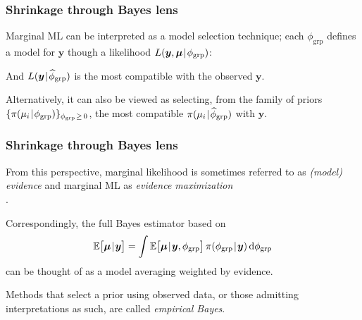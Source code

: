 \documentclass[18pt]{beamer}
\newcommand{\defineTightSpacing}{%
	\setlength{\abovedisplayskip}{.25\baselineskip}%
	\setlength{\belowdisplayskip}{.25\baselineskip}%
}
\renewcommand{\textsc}[1]{{\small \MakeUppercase{#1}}}
\newcommand{\given}{\thinnerspace | \thinnerspace}
\newcommand{\diff}{\operatorname{\mathrm{d}}\!{}}
\newcommand{\thinnerspace}{\mskip.5\thinmuskip}
\newcommand{\expectation}{\mathbb{E}}
\newcommand{\density}{\operatorname{\pi}}
\newcommand{\likelihood}{L}
\newcommand{\by}{\bm{y}}
\newcommand{\bmu}{\bm{\mu}}
\begin{document}
\begin{frame}
\frametitle{Shrinkage through Bayes lens}
Marginal {\small ML} can be interpreted as a model selection technique;
each $\phi_{\mathrm{grp}}$ defines a model for $\by$ though a likelihood $\likelihood(\by, \bmu \given \phi_{\mathrm{grp}})$:
\vspace*{-.4\baselineskip}
\begin{figure} 
\end{figure}
\vspace*{-.7\baselineskip}

\pause
And $\likelihood(\by \given \widehat{\phi}_{\mathrm{grp}})$ is the most compatible with the observed $\by$.

\pause
\smallskip
Alternatively, it can also be viewed as selecting, from the family of priors $\{ \density(\mu_i \given \phi_{\mathrm{grp}}) \}_{ \phi_{\mathrm{grp}} \thinnerspace \geq \, 0 } $, the most compatible $\density(\mu_i \given \widehat{\phi}_{\mathrm{grp}})$ with $\by$.
\end{frame}

\begin{frame}
\frametitle{Shrinkage through Bayes lens}

From this perspective, marginal likelihood is sometimes referred to as \textit{(model) evidence} and marginal \textsc{ML} as \textit{evidence maximization}\\
\hfill \citep{mackay1992bayesian_model_comparison}.%

\pause
Correspondingly, the full Bayes estimator based on
\begin{equation*} \defineTightSpacing%
\expectation\big[
	\bmu \given \by
\big]
	= \int \expectation\big[
		\bmu \given \by, \phi_{\mathrm{grp}}
	\big] \density(\phi_{\mathrm{grp}} \given \by) \diff \phi_{\mathrm{grp}}
\end{equation*}
can be thought of as a model averaging weighted by evidence.

\pause
\smallskip
Methods that select a prior using observed data, or those admitting interpretations as such, are called \textit{empirical Bayes}.
\end{frame}
\end{document}
